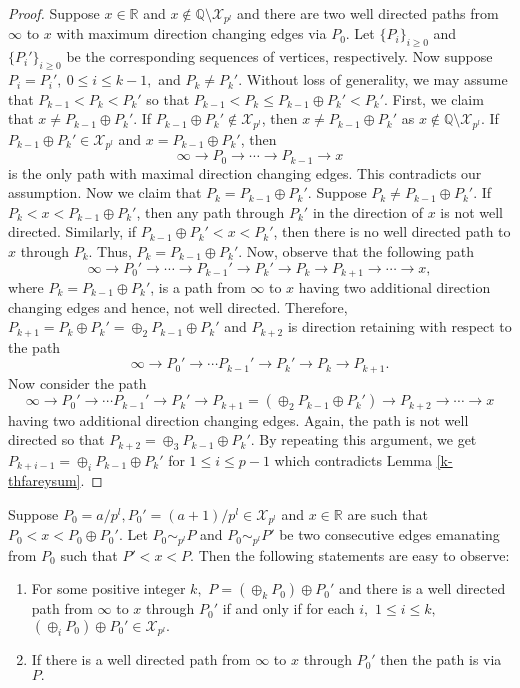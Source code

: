 \documentclass[12pt]{elsarticle}
\theoremstyle{definition}
\newcommand{\field}[1]{\mathbb{#1}}          \newcommand{\Q}{\field{Q}}
\newcommand{\R}{\field{R}}                   \newcommand{\Z}{\field{Z}}
\newcommand{\mX}{{\mathcal X}}
\begin{document}
\begin{proof}	Suppose $x\in\R$ and $x\not\in\Q\setminus\mX_{p^l}$ and there are two well directed paths from $\infty$ to $x$ with maximum direction changing edges via $P_0$. Let $\{P_i\}_{i\ge0}$ and $\{P_i'\}_{i\ge0}$ be the corresponding sequences of vertices, respectively. 
Now suppose  $P_i=P_i',~0\le i\le k-1,$ and $P_k\ne P_k'$. Without loss of generality, we may assume that $P_{k-1}<P_k<P_k'$ so that $P_{k-1}<P_k\le P_{k-1}\oplus P_{k}'<P_k'.$ First, we claim that  $x\ne P_{k-1}\oplus P_{k}'.$ If $ P_{k-1}\oplus P_{k}'\not\in\mX_{p^l}$, then $x\ne P_{k-1}\oplus P_{k}'$ as $x\not\in\Q\setminus\mX_{p^l}$. If $P_{k-1}\oplus P_{k}'\in\mX_{p^l}$  and $x=P_{k-1}\oplus P_{k}'$, then 
	$$\infty\to P_0\to\cdots\to P_{k-1}\to x$$ is the only path with maximal direction changing edges. This contradicts our assumption. Now we claim that $P_k= P_{k-1}\oplus P_k'$. Suppose $P_k\ne P_{k-1}\oplus P_k'$. If $P_k<x<P_{k-1}\oplus P_k'$, then any path through $P_k'$ in the direction of $x$ is not well directed. Similarly, if $P_{k-1}\oplus P_k'<x<P_k'$, then there is no well directed path to $x$ through $P_k$. Thus,  $P_k= P_{k-1}\oplus P_k'.$ Now, observe that the following path 
	\begin{equation}\label{extraflips}
	\infty\to P_0'\to\cdots\to P_{k-1}'\to P_k'\to P_k\to P_{k+1}\to\cdots\to x,
	\end{equation}
	where $P_k= P_{k-1}\oplus P_k'$, is a path from $\infty$ to $x$ having two additional direction changing edges and hence,  not well directed. Therefore, $P_{k+1}=P_{k}\oplus P_{k}'=\oplus_2P_{k-1}\oplus P_k'$ and $P_{k+2}$ is direction retaining with respect to the path
	$$\infty\to P_0'\to\cdots P_{k-1}'\to P_k'\to P_k\to P_{k+1}.$$
	Now consider the path
	\begin{equation}\label{extraflips1}
	\infty\to P_0'\to\cdots P_{k-1}'\to P_k'\to P_{k+1}=(\oplus_2P_{k-1}\oplus P_k')\to P_{k+2}\to\cdots\to x
	\end{equation}
	having two additional direction changing edges. Again, the path is not well directed so that $P_{k+2}=\oplus_3 P_{k-1}\oplus P_k'$. By repeating this argument, we get $P_{k+i-1}=\oplus_i P_{k-1}\oplus P_k'$ for $1\le i\le p-1$ which contradicts Lemma \ref{k-thfareysum}. 
\end{proof}
\begin{remark}\label{remark_maximumdchange}	Suppose $P_0=a/p^l,P_0'=(a+1)/p^l\in \mX_{p^l}$ and $x\in\R$ are such that $P_0<x<P_0\oplus P_0'$. Let   $P_0\sim_{p^l} P$ and $P_0\sim_{p^l} P'$ be two consecutive edges emanating from $P_0$ such that $P'<x<P.$ Then the following statements are easy to observe:
	\begin{enumerate}
		\item For some positive integer $k,$ $P=(\oplus_k P_0)\oplus P_0'$ and there is a well directed path from $\infty$ to $x$ through $P_0'$ if and only if for each $i,$ $1\le i\le k,$ $(\oplus_i P_0)\oplus P_0'\in\mX_{p^l}.$
		\item If there is a well directed path from $\infty$ to $x$ through $P_0'$ then the path is via $P.$
	\end{enumerate}
	
\end{remark}
\end{document}
